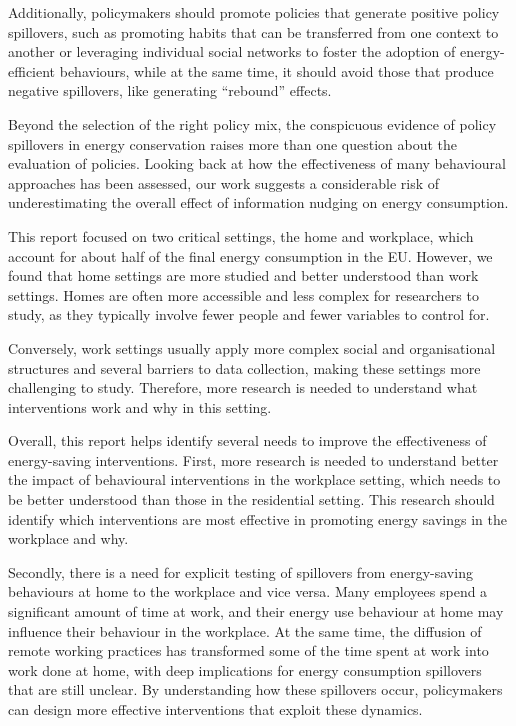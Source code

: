 \documentclass[
  11pt,
]{article}
\begin{document}
Additionally, policymakers should promote policies that generate
positive policy spillovers, such as promoting habits that can be
transferred from one context to another or leveraging individual social
networks to foster the adoption of energy-efficient behaviours, while at
the same time, it should avoid those that produce negative spillovers,
like generating ``rebound'' effects.

Beyond the selection of the right policy mix, the conspicuous evidence
of policy spillovers in energy conservation raises more than one
question about the evaluation of policies. Looking back at how the
effectiveness of many behavioural approaches has been assessed, our work
suggests a considerable risk of underestimating the overall effect of
information nudging on energy consumption.

This report focused on two critical settings, the home and workplace,
which account for about half of the final energy consumption in the EU.
However, we found that home settings are more studied and better
understood than work settings. Homes are often more accessible and less
complex for researchers to study, as they typically involve fewer people
and fewer variables to control for.

Conversely, work settings usually apply more complex social and
organisational structures and several barriers to data collection,
making these settings more challenging to study. Therefore, more
research is needed to understand what interventions work and why in this
setting.

Overall, this report helps identify several needs to improve the
effectiveness of energy-saving interventions. First, more research is
needed to understand better the impact of behavioural interventions in
the workplace setting, which needs to be better understood than those in
the residential setting. This research should identify which
interventions are most effective in promoting energy savings in the
workplace and why.

Secondly, there is a need for explicit testing of spillovers from
energy-saving behaviours at home to the workplace and vice versa. Many
employees spend a significant amount of time at work, and their energy
use behaviour at home may influence their behaviour in the workplace. At
the same time, the diffusion of remote working practices has transformed
some of the time spent at work into work done at home, with deep
implications for energy consumption spillovers that are still unclear.
By understanding how these spillovers occur, policymakers can design
more effective interventions that exploit these dynamics.
\end{document}
